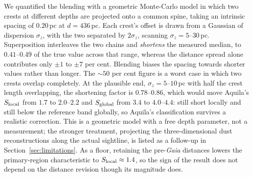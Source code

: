 \documentclass[usenatbib,twoside,twocolumn]{mnras}
\begin{document}
We quantified the blending with a geometric Monte-Carlo model in which two crests at different depths are projected onto a common spine, taking an intrinsic spacing of $0.20$\,pc at $d=436$\,pc. Each crest's offset is drawn from a Gaussian of dispersion $\sigma_z$, with the two separated by $2\sigma_z$, scanning $\sigma_z=5$--$30$\,pc. Superposition interleaves the two chains and \emph{shortens} the measured median, to $0.41$--$0.49$ of the true value across that range, whereas the distance spread alone contributes only $\pm1$ to $\pm7$ per cent. Blending biases the spacing towards shorter values rather than longer. The $\sim50$ per cent figure is a worst case in which two crests overlap completely. At the plausible end, $\sigma_z=5$--$10$\,pc with half the crest length overlapping, the shortening factor is $0.78$--$0.86$, which would move Aquila's $S_{\rm local}$ from $1.7$ to $2.0$--$2.2$ and $S_{\rm global}$ from $3.4$ to $4.0$--$4.4$: still short locally and still below the reference band globally, so Aquila's classification survives a realistic correction. This is a geometric model with a free depth parameter, not a measurement; the stronger treatment, projecting the three-dimensional dust reconstructions along the actual sightline, is listed as a follow-up in Section~\ref{sec:limitations}. As a floor, retaining the pre-\textit{Gaia} distances lowers the primary-region characteristic to $S_{\rm local}\approx1.4$, so the sign of the result does not depend on the distance revision though its magnitude does.
\end{document}
